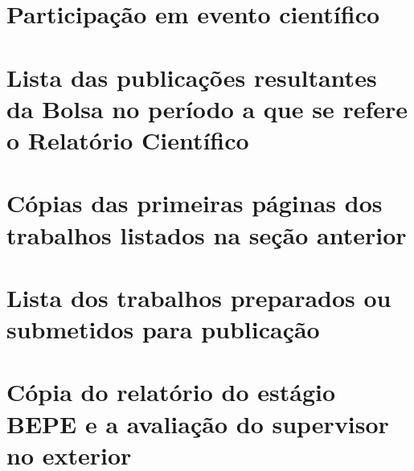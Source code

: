 \documentclass[12pt,dvipsnames,a4paper]{article}
\begin{document}
\section{Participação em evento científico}

\section{Lista das publicações resultantes da Bolsa no período a que se refere o Relatório Científico}

\section{Cópias das primeiras páginas dos trabalhos listados na seção anterior}
%

\section{Lista dos trabalhos preparados ou submetidos para publicação}

\section{Cópia do relatório do estágio BEPE e a avaliação do supervisor no exterior}
\end{document}
